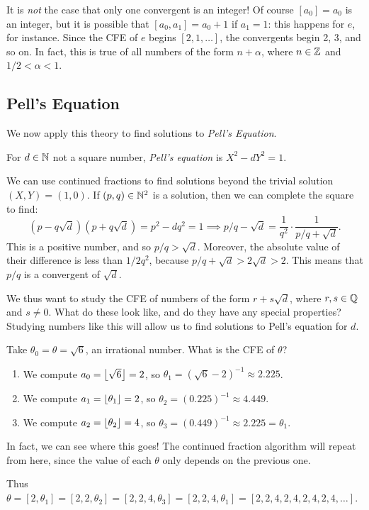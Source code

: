 \documentclass{article}
\begin{document}
\begin{note}
	It is \textit{not} the case that only one convergent is an integer! Of course $[a_0] = a_0$ is an integer, but it is possible that $[a_0, a_1] = a_0 + 1$ if $a_1 = 1$: this happens for $e$, for instance. Since the CFE of $e$ begins $[2, 1, \dots]$, the convergents begin 2, 3, and so on. In fact, this is true of all numbers of the form $n + \alpha$, where $n \in \mathbb{Z}$ and $1/2 < \alpha < 1$.
\end{note}


\subsection{Pell's Equation}
\label{subsection-continued-fractions-pells-equation}

We now apply this theory to find solutions to \textit{Pell's Equation}.

\begin{definition}
	\label{pells-equation}
    For $d \in \mathbb{N}$ not a square number, \textit{Pell's equation} is $X^2 - dY^2 = 1$.
\end{definition}

We can use continued fractions to find solutions beyond the trivial solution $(X, Y) = (1, 0)$. If $(p, q) \in \mathbb{N}^2$ is a solution, then we can complete the square to find:
\[
(p - q \sqrt d)(p + q \sqrt d) = p^2 - dq^2 = 1 \implies p/q - \sqrt{d} = \frac{1}{q^2} \cdot \frac{1}{p/q + \sqrt{d}}.
\]
This is a positive number, and so $p/q > \sqrt d$. Moreover, the absolute value of their difference is less than $1/2q^2$, because $p/q + \sqrt{d} > 2 \sqrt d > 2$. This means that $p/q$ is a convergent of $\sqrt d$.

We thus want to study the CFE of numbers of the form $r + s \sqrt{d}$, where $r,s \in \mathbb{Q}$ and $s \neq 0$. What do these look like, and do they have any special properties? Studying numbers like this will allow us to find solutions to Pell's equation for $d$.

\begin{example}
	\label{example-cfe-of-sqrt-6}
    Take $\theta_0 = \theta = \sqrt 6$, an irrational number. What is the CFE of $\theta$?
    \begin{enumerate}
	    \item We compute $a_0 = \left\lfloor\sqrt{6}\right\rfloor = 2$, so $\theta_1 = (\sqrt 6 - 2)^{-1} \approx 2.225$.
	    \item We compute $a_1 = \left\lfloor\theta_1\right\rfloor = 2$, so $\theta_2 = (0.225)^{-1} \approx 4.449$.
	    \item We compute $a_2 = \left\lfloor\theta_2\right\rfloor = 4$, so $\theta_3 = (0.449)^{-1} \approx 2.225 = \theta_1$.
	\end{enumerate}
	In fact, we can see where this goes! The continued fraction algorithm will repeat from here, since the value of each $\theta$ only depends on the previous one.
	
	Thus $\theta = [2, \theta_1] = [2, 2, \theta_2] = [2, 2, 4, \theta_3] = [2, 2, 4, \theta_1] = [2, 2, 4, 2, 4, 2, 4, 2, 4, \dots]$.
\end{example}
\end{document}
